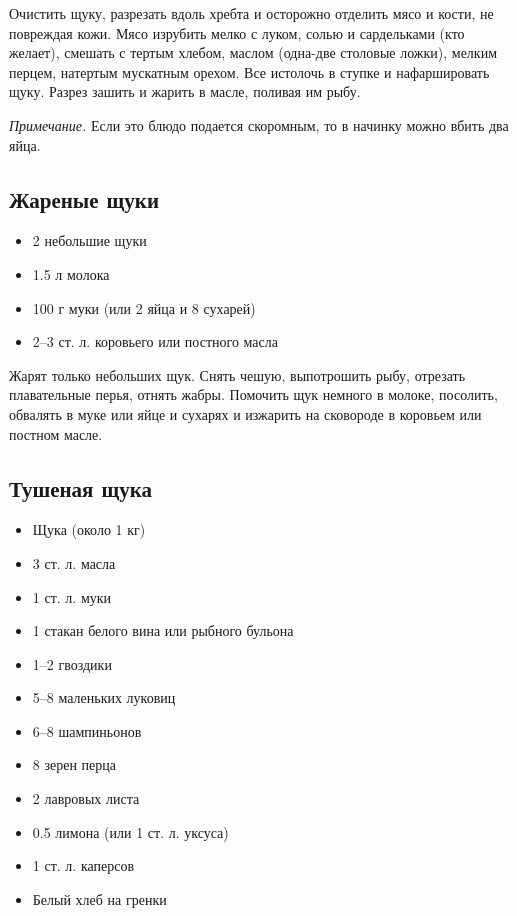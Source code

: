 Очистить щуку, разрезать вдоль хребта и осторожно отделить мясо и кости, не повреждая кожи. Мясо изрубить мелко с луком, солью и сардельками (кто желает), смешать с тертым хлебом, маслом (одна-две столовые ложки), мелким перцем, натертым мускатным орехом. Все истолочь в ступке и нафаршировать щуку. Разрез зашить и жарить в масле, поливая им рыбу.

\emph{Примечание.} Если это блюдо подается скоромным, то в начинку можно вбить два яйца.

\subsection{Жареные щуки}

\begin{itemize} 
	\item  2 небольшие щуки 
    \item  1.5 л молока 
    \item  100 г муки (или 2 яйца и 8 сухарей) 
    \item  2–3 ст. л. коровьего или постного масла
\end{itemize}

Жарят только небольших щук. Снять чешую, выпотрошить рыбу, отрезать плавательные перья, отнять жабры. Помочить щук немного в молоке, посолить, обвалять в муке или яйце и сухарях и изжарить на сковороде в коровьем или постном масле.

\subsection{Тушеная щука}

\begin{itemize} 
	\item  Щука (около 1 кг) 
    \item  3 ст. л. масла 
    \item  1 ст. л. муки 
    \item  1 стакан белого вина или рыбного бульона 
    \item  1–2 гвоздики 
    \item  5–8 маленьких луковиц 
    \item  6–8 шампиньонов 
    \item  8 зерен перца 
    \item  2 лавровых листа 
    \item  0.5 лимона (или 1 ст. л. уксуса) 
    \item  1 ст. л. каперсов 
    \item  Белый хлеб на гренки
\end{itemize}


